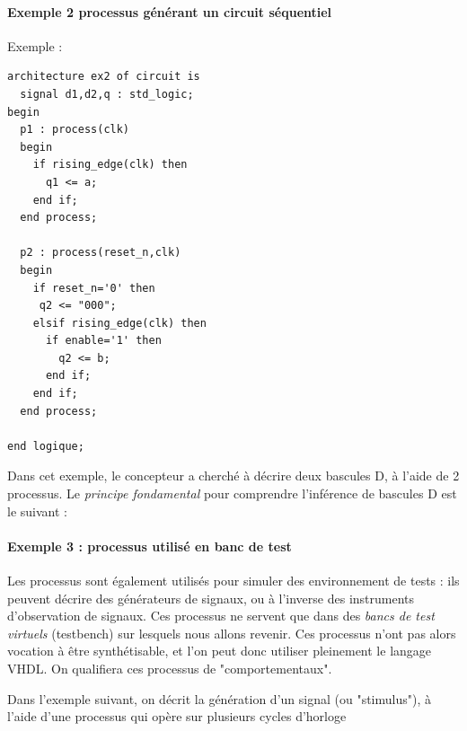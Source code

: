 \paragraph{Exemple 2 \: processus générant un circuit séquentiel}
Exemple :
\begin{lstlisting}[frame=single]
architecture ex2 of circuit is
  signal d1,d2,q : std_logic;
begin
  p1 : process(clk)
  begin
    if rising_edge(clk) then
      q1 <= a;
    end if;
  end process;

  p2 : process(reset_n,clk)
  begin
    if reset_n='0' then
     q2 <= "000";
    elsif rising_edge(clk) then
      if enable='1' then
        q2 <= b;
      end if;
    end if;
  end process;

end logique;
\end{lstlisting}

Dans cet exemple, le concepteur a cherché à décrire deux bascules D, à l'aide de 2 processus. Le {\it principe fondamental} pour comprendre l'inférence de bascules D est le suivant :
\begin{center}
\end{center}


\paragraph{Exemple 3 : processus utilisé en banc de test}
Les processus sont également utilisés pour simuler des environnement de tests : ils peuvent décrire des générateurs de signaux, ou à l'inverse des instruments d'observation de signaux. Ces
processus ne servent que dans des {\it bancs de test virtuels} (testbench) sur lesquels nous allons revenir. Ces processus n'ont pas alors vocation à être synthétisable, et l'on peut donc
utiliser pleinement le langage VHDL. On qualifiera ces processus de "comportementaux".

Dans l'exemple suivant, on décrit la génération d'un signal (ou "stimulus"), à l'aide d'une processus qui opère sur plusieurs cycles d'horloge

